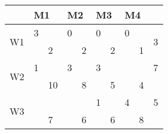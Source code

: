 \documentclass[../main-sheet.tex]{subfiles}
\begin{document}
\newpage
\begin{table}[H]
    \begin{tabular}{l|ll|ll|ll|ll|l}
     & \multicolumn{2}{l|}{M1} & \multicolumn{2}{l|}{M2} & \multicolumn{2}{l|}{M3} & \multicolumn{2}{l|}{M4} &  \\ \hline
    \multicolumn{1}{c|}{\multirow{2}{*}{W1}} & 3 &  & 0 &  & 0 &  & 0 &  & \multirow{2}{*}{3} \\ \cline{3-3} \cline{5-5} \cline{7-7} \cline{9-9}
    \multicolumn{1}{c|}{} & \multicolumn{1}{l|}{} & 2 & \multicolumn{1}{l|}{} & 2 & \multicolumn{1}{l|}{} & 2 & \multicolumn{1}{l|}{} & 1 &  \\ \hline
    \multirow{2}{*}{W2} & 1 &  & 3 &  & 3 &  &  &  & 7 \\ \cline{3-3} \cline{5-5} \cline{7-7} \cline{9-9}
     & \multicolumn{1}{l|}{} & 10 & \multicolumn{1}{l|}{} & 8 & \multicolumn{1}{l|}{} & 5 & \multicolumn{1}{l|}{} & 4 &  \\ \hline
    \multirow{2}{*}{W3} &  &  &  &  & 1 &  & 4 &  & 5 \\ \cline{3-3} \cline{5-5} \cline{7-7} \cline{9-9}
     & \multicolumn{1}{l|}{} & 7 & \multicolumn{1}{l|}{} & 6 & \multicolumn{1}{l|}{} & 6 & \multicolumn{1}{l|}{} & 8 &  \\ \hline
    \end{tabular}
    \end{table}
    \newpage

    \def\Mc[#1]#2#3{\multicolumn{#1}{#2}{#3}}
\def\mc#1#2{\multicolumn{1}{#1}{#2}}
\end{document}
